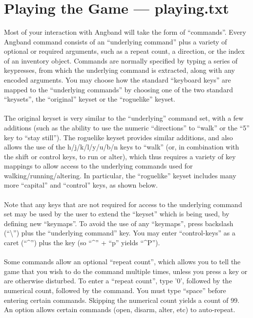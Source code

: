 \section{Playing the Game --- playing.txt}
\paragraph{}Most of your interaction with Angband will take the form of
``commands''.  Every Angband command consists of an ``underlying
command'' plus a variety of optional or required arguments, such as a
repeat count, a direction, or the index of an inventory object. Commands
are normally specified by typing a series of keypresses, from which the
underlying command is extracted, along with any encoded arguments. You
may choose how the standard ``keyboard keys'' are mapped to the
``underlying commands'' by choosing one of the two standard ``keysets'',
the ``original'' keyset or the ``roguelike'' keyset.

\paragraph{}The original keyset is very similar to the ``underlying''
command set, with a few additions (such as the ability to use the
numeric ``directions'' to ``walk'' or the ``5'' key to ``stay still'').
The roguelike keyset provides similar additions, and also allows the use
of the h/j/k/l/y/u/b/n keys to ``walk'' (or, in combination with the
shift or control keys, to run or alter), which thus requires a variety
of key mappings to allow access to the underlying commands used for
walking/running/altering. In particular, the ``roguelike'' keyset
includes many more ``capital'' and ``control'' keys, as shown below.

\paragraph{}Note that any keys that are not required for access to the
underlying command set may be used by the user to extend the ``keyset''
which is being used, by defining new ``keymaps''. To avoid the use of
any ``keymaps'', press backslash (``\textbackslash '') plus the
``underlying command'' key. You may enter ``control-keys'' as a caret
(``\^{}'') plus the key (so ``\^{}'' + ``p'' yields ``\^{}P'').

\paragraph{}Some commands allow an optional ``repeat count'', which
allows you to tell the game that you wish to do the command multiple
times, unless you press a key or are otherwise disturbed. To enter a
``repeat count'', type '0', followed by the numerical count, followed by
the command. You must type ``space'' before entering certain commands.
Skipping the numerical count yields a count of 99.  An option allows
certain commands (open, disarm, alter, etc) to auto-repeat.

